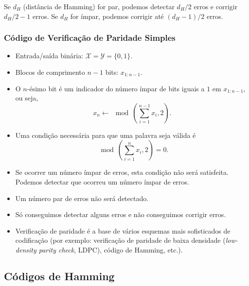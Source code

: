 \begin{frame}[allowframebreaks]
	Se $d_H$ (distância de Hamming) for par, podemos detectar $d_H/2$ erros
	e corrigir $d_H/2 - 1$ erros.
	Se $d_H$ for ímpar, podemos corrigir até $(d_H - 1)/2$ erros.
\end{frame}

\begin{frame}[allowframebreaks]
  \frametitle{Código de Verificação de Paridade Simples}
  \begin{itemize}
  \item Entrada/saída binária: $\mathcal{X} = \mathcal{Y} = \{ 0, 1\}$.
  \item Blocos de comprimento $n-1$ bits: $x_{1:n-1}$.
  \item O $n$-ésimo bit é um indicador do número ímpar de bits iguais a $1$ em $x_{1:n-1}$, ou seja,
	\begin{equation}
	x_n \leftarrow \mod \left( \sum_{i=1}^{n-1} x_i , 2 \right) .
	\end{equation}
  \item Uma condição necessária para que uma palavra seja válida é
	\begin{equation}
	\mod \left( \sum_{i=1}^{n} x_i , 2 \right) = 0 .
	\end{equation}
  \item Se ocorrer um número ímpar de erros, esta condição não será satisfeita. Podemos detectar que ocorreu um número ímpar de erros.
  \item Um número par de erros não será detectado.
  \item Só conseguimos detectar alguns erros e não conseguimos corrigir erros.
  \item Verificação de paridade é a base de vários esquemas mais sofisticados de codificação 
	(por exemplo: verificação de paridade de baixa densidade (\textit{low-density parity check}, LDPC),
	código de Hamming, etc.).
  \end{itemize}
\end{frame}



\subsection{Códigos de Hamming}

